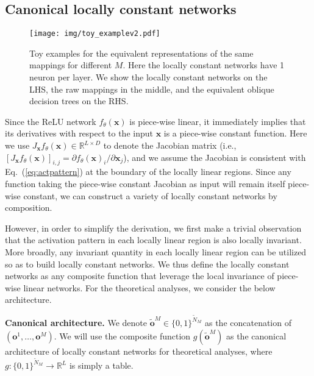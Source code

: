 \documentclass{article} \usepackage{iclr2020_conference,times}
\def\vo{{\bm{o}}}
\def\vx{{\bm{x}}}
\def\sR{{\mathbb{R}}}
\begin{document}
 \vspace{-1mm}
\subsection{Canonical locally constant networks}\label{sec:lcn}
\begin{figure}
\vspace{-2mm}
\centering
\texttt{[image: img/toy\_examplev2.pdf]}
	\caption{Toy examples for the equivalent representations of the same mappings for different $M$. Here the locally constant networks have 1 neuron per layer. We show the locally constant networks on the LHS, the raw mappings in the middle, and the equivalent oblique decision trees on the RHS.\!\!\!\!\!}\label{fig:toy_example}
    \vspace{-3mm}
\end{figure}

Since the ReLU network $f_\theta(\vx)$ is piece-wise linear, it immediately implies that its derivatives with respect to the input $\vx$ is a piece-wise constant function. Here we use $J_\vx f_\theta (\vx) \in \sR^{L \times D}$ to denote the Jacobian matrix (i.e., $[J_\vx f_\theta (\vx)]_{i,j} = \partial f_\theta(\vx)_i / \partial \vx_j$), and we assume the Jacobian is consistent with Eq.~(\ref{eq:actpattern}) at the boundary of the locally linear regions. Since any function taking the piece-wise constant Jacobian as input will remain itself piece-wise constant, we can construct a variety of locally constant networks by composition.

However, in order to simplify the derivation, we first make a trivial observation that the activation pattern in each locally linear region is also locally invariant. More broadly, any invariant quantity in each locally linear region can be utilized so as to build locally constant networks. We thus define the locally constant networks as any composite function that leverage the local invariance of piece-wise linear networks. For the theoretical analyses, we consider the below architecture.

\textbf{Canonical architecture.} We denote $\tilde \vo^M \in \{0, 1\}^{\tilde N_M}$ as the concatenation of $(\vo^1,\dots,\vo^M)$.
We will use the composite function $g(\tilde \vo^M)$ as the canonical architecture of locally constant networks for theoretical analyses, where $g: \{0, 1\}^{\tilde N_M} \to \sR^L$ is simply a table.
\end{document}

